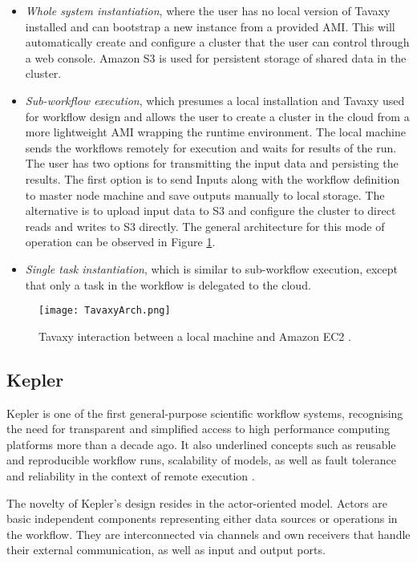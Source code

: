 \begin{itemize}
	\item \textit{Whole system instantiation}, where the user has no local version of Tavaxy installed and can bootstrap a new instance from a provided AMI. This will automatically create and configure a cluster that the user can control through a web console. Amazon S3 \cite{S3} is used for persistent storage of shared data in the cluster.
	\item \textit{Sub-workflow execution}, which presumes a local installation and Tavaxy used for workflow design and allows the user to create a cluster in the cloud from a more lightweight AMI wrapping the runtime environment. The local machine sends the workflows remotely for execution and waits for results of the run. The user has two options for transmitting the input data and persisting the results. The first option is to send Inputs along with the workflow definition to master node machine and save outputs manually to local storage. The alternative is to upload input data to S3 and configure the cluster to direct reads and writes to S3 directly. The general architecture for this mode of operation can be observed in Figure \ref{TavaxyArch}.
	\item \textit{Single task instantiation}, which is similar to sub-workflow execution, except that only a task in the workflow is delegated to the cloud.
\end{itemize}

\vspace{5mm}
\begin{figure}[H]
	\centering
		\texttt{[image: TavaxyArch.png]}
	\caption{Tavaxy interaction between a local machine and Amazon EC2 \cite{Abouelhoda2012}.}
	\label{TavaxyArch}
\end{figure}

\subsection{Kepler}

Kepler \cite{Kepler} is one of the first general-purpose scientific workflow systems, recognising the need for transparent and simplified access to high performance computing platforms more than a decade ago. It also underlined concepts such as reusable and reproducible workflow runs, scalability of models, as well as fault tolerance and reliability in the context of remote execution \cite{Ludascher2006}.

The novelty of Kepler's design resides in the actor-oriented model. Actors are basic independent components representing either data sources or operations in the workflow. They are interconnected via channels and own receivers that handle their external communication, as well as input and output ports.

